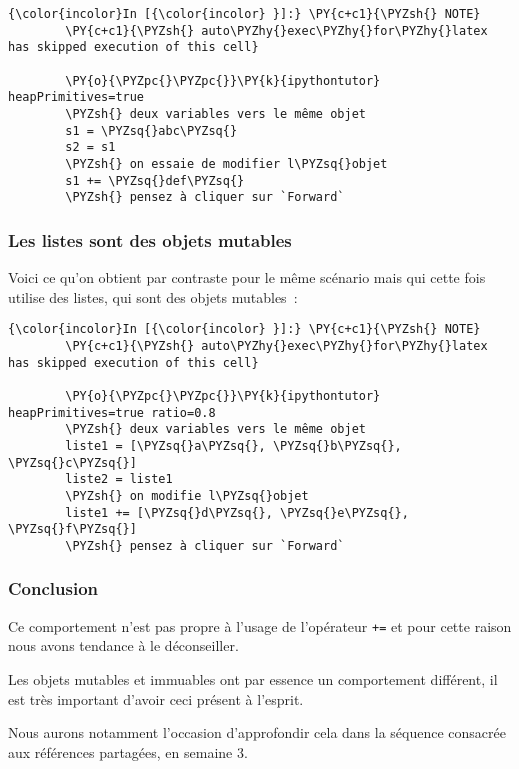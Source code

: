     \begin{Verbatim}[commandchars=\\\{\},frame=single,framerule=0.3mm,rulecolor=\color{cellframecolor}]
{\color{incolor}In [{\color{incolor} }]:} \PY{c+c1}{\PYZsh{} NOTE}
        \PY{c+c1}{\PYZsh{} auto\PYZhy{}exec\PYZhy{}for\PYZhy{}latex has skipped execution of this cell}
        
        \PY{o}{\PYZpc{}\PYZpc{}}\PY{k}{ipythontutor} heapPrimitives=true
        \PYZsh{} deux variables vers le même objet
        s1 = \PYZsq{}abc\PYZsq{}
        s2 = s1
        \PYZsh{} on essaie de modifier l\PYZsq{}objet
        s1 += \PYZsq{}def\PYZsq{}
        \PYZsh{} pensez à cliquer sur `Forward`
\end{Verbatim}


    \hypertarget{les-listes-sont-des-objets-mutables}{%
\subsubsection{Les listes sont des objets
mutables}\label{les-listes-sont-des-objets-mutables}}

    Voici ce qu'on obtient par contraste pour le même scénario mais qui
cette fois utilise des listes, qui sont des objets mutables~:

    \begin{Verbatim}[commandchars=\\\{\},frame=single,framerule=0.3mm,rulecolor=\color{cellframecolor}]
{\color{incolor}In [{\color{incolor} }]:} \PY{c+c1}{\PYZsh{} NOTE}
        \PY{c+c1}{\PYZsh{} auto\PYZhy{}exec\PYZhy{}for\PYZhy{}latex has skipped execution of this cell}
        
        \PY{o}{\PYZpc{}\PYZpc{}}\PY{k}{ipythontutor} heapPrimitives=true ratio=0.8
        \PYZsh{} deux variables vers le même objet
        liste1 = [\PYZsq{}a\PYZsq{}, \PYZsq{}b\PYZsq{}, \PYZsq{}c\PYZsq{}]
        liste2 = liste1
        \PYZsh{} on modifie l\PYZsq{}objet
        liste1 += [\PYZsq{}d\PYZsq{}, \PYZsq{}e\PYZsq{}, \PYZsq{}f\PYZsq{}]
        \PYZsh{} pensez à cliquer sur `Forward`
\end{Verbatim}


    \hypertarget{conclusion}{%
\subsubsection{Conclusion}\label{conclusion}}

    Ce comportement n'est pas propre à l'usage de l'opérateur \texttt{+=} et
pour cette raison nous avons tendance à le déconseiller.

Les objets mutables et immuables ont par essence un comportement
différent, il est très important d'avoir ceci présent à l'esprit.

Nous aurons notamment l'occasion d'approfondir cela dans la séquence
consacrée aux références partagées, en semaine 3.


    
    
    
